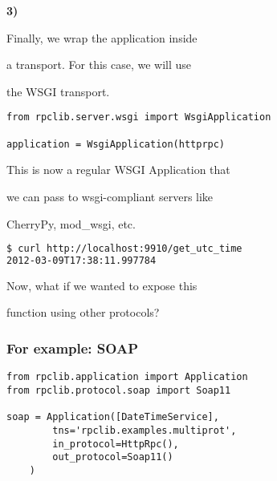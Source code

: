 \documentclass{beamer}
\begin{document}
\begin{frame}
  \LARGE
  \color{red} \textbf{3)} \color{black}

  \begin{center}
    Finally, we wrap the application inside

    \bigskip

    a transport. For this case, we will use

    \bigskip

    the WSGI transport.

  \end{center}

\end{frame}

\begin{frame}[fragile]
 \begin{lstlisting}
from rpclib.server.wsgi import WsgiApplication

application = WsgiApplication(httprpc)
 \end{lstlisting}

  \begin{center}
    This is now a regular WSGI Application that

    \bigskip

    we can pass to wsgi-compliant servers like

    \bigskip

    CherryPy, mod\_wsgi, etc.
  \end{center}
  \pause
  \begin{lstlisting}[language=sh]
$ curl http://localhost:9910/get_utc_time
2012-03-09T17:38:11.997784
  \end{lstlisting}
\end{frame}

\begin{frame}
  \LARGE
  \begin{center}
    Now, what if we wanted to expose this

    \bigskip

    function using other protocols?
  \end{center}
\end{frame}

\begin{frame}[fragile]
  \frametitle{For example: SOAP}

  \begin{lstlisting}
from rpclib.application import Application
from rpclib.protocol.soap import Soap11

soap = Application([DateTimeService],
        tns='rpclib.examples.multiprot',
        in_protocol=HttpRpc(),
        out_protocol=Soap11()
    )
  \end{lstlisting}
\end{frame}
\end{document}
